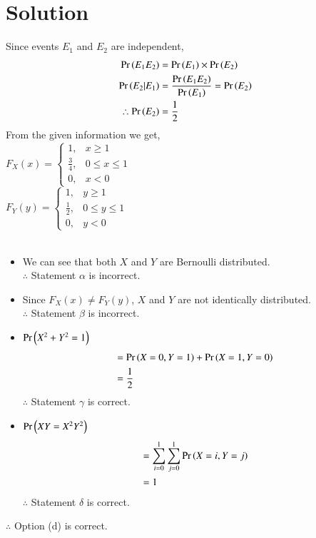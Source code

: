 \documentclass[journal,12pt,twocolumn]{IEEEtran}
\begin{document}
\section*{Solution}
Since events $E_1$ and $E_2$ are independent, 
\begin{align}
    \Pr\left(E_1E_2\right)&=\Pr\left(E_1\right)\times\Pr\left(E_2\right) \nonumber\\
    \Pr\left(E_2|E_1\right)&=\frac{\Pr\left(E_1E_2\right)}{\Pr\left(E_1\right)} = \Pr\left(E_2\right) \nonumber\\
     \therefore \Pr\left(E_2\right) &= \frac{1}{2}
\end{align}
From the given information we get,\\
$F_X(x)=
\begin{cases}
1, &x\geq1\\
\frac{3}{4}, & 0\leq x \leq1\\
0, &x<0
\end{cases}$
\\
$F_Y(y)=
\begin{cases}
1, &y\geq1\\
\frac{1}{2}, & 0\leq y \leq1\\
0, &y<0
\end{cases}$
\\\\
\begin{itemize}
    \item We can see that both $X$ and $Y$ are Bernoulli distributed.\\
    $\therefore$ Statement $\alpha$ is incorrect.\\
    \item Since $F_X(x)\neq F_Y(y)$, $X$ and $Y$ are not identically distributed.\\
    $\therefore$ Statement $\beta$ is incorrect.\\
    \item $\Pr\left(X^2+Y^2=1\right)$
    \begin{align}
        &=\Pr\left(X=0,Y=1\right)+\Pr\left(X=1,Y=0\right)\nonumber\\
        &= \frac{1}{2}
    \end{align}
    $\therefore$ Statement $\gamma$ is correct.\\
    \item $\Pr\left(XY=X^2Y^2\right)$
    \begin{align}
        &=\sum_{i=0}^1\sum_{j=0}^1\Pr\left(X=i,Y=j\right)\nonumber\\
        &= 1
    \end{align}
    $\therefore$ Statement $\delta$ is correct.\\
\end{itemize}

$\therefore$ Option (d) is correct.
\end{document}
